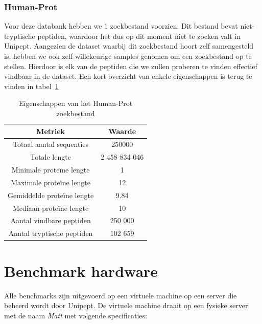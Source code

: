 \documentclass[11pt,dutch,faculty=we,layout=titlefont,underline=false,titleUppercase=true,titleUnderline=true]{ugent2016-report}
\begin{document}
    \subsubsection{Human-Prot}
    Voor deze databank hebben we 1 zoekbestand voorzien.
    Dit bestand bevat niet-tryptische peptiden, waardoor het dus op dit moment niet te zoeken valt in Unipept.
    Aangezien de dataset waarbij dit zoekbestand hoort zelf samengesteld is, hebben we ook zelf willekeurige samples genomen om een zoekbestand op te stellen.
    Hierdoor is elk van de peptiden die we zullen proberen te vinden effectief vindbaar in de dataset.
    Een kort overzicht van enkele eigenschappen is terug te vinden in tabel~\ref{tab:humanprot_zoekbestand}

    \begin{table}[h!]
        \centering
        \begin{tabular}{ c c }
            Metriek                    & Waarde        \\
            \hline\hline
            Totaal aantal sequenties   & 250000        \\
            Totale lengte              & 2 458 834 046 \\
            Minimale proteïne lengte   & 1             \\
            Maximale proteïne lengte   & 12            \\
            Gemiddelde proteïne lengte & 9.84          \\
            Mediaan proteïne lengte    & 10            \\
            Aantal vindbare peptiden   & 250 000       \\
            Aantal tryptische peptiden & 102 659       \\
            \hline
        \end{tabular}
        \caption{Eigenschappen van het Human-Prot zoekbestand}
        \label{tab:humanprot_zoekbestand}
    \end{table}


    \section{Benchmark hardware}\label{sec:benchmark-hardware}
    Alle benchmarks zijn uitgevoerd op een virtuele machine op een server die beheerd wordt door Unipept.
    De virtuele machine draait op een fysieke server met de naam \textit{Matt} met volgende specificaties:
\end{document}
